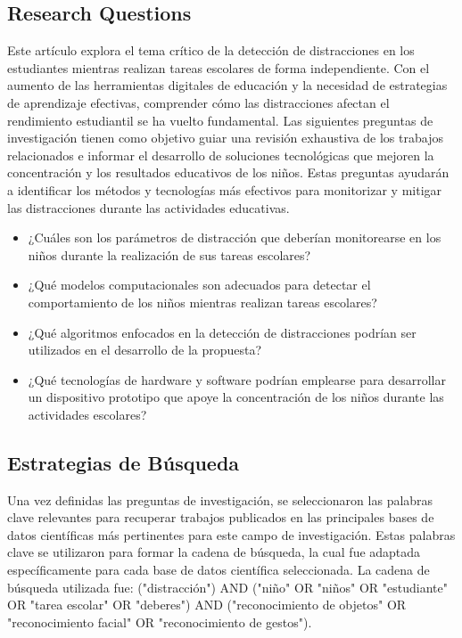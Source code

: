 \documentclass[a4paper,fleqn]{cas-sc}
\begin{document}
	\subsection{Research Questions}
	Este artículo explora el tema crítico de la detección de distracciones en los estudiantes mientras realizan tareas escolares de forma independiente. Con el aumento de las herramientas digitales de educación y la necesidad de estrategias de aprendizaje efectivas, comprender cómo las distracciones afectan el rendimiento estudiantil se ha vuelto fundamental. Las siguientes preguntas de investigación tienen como objetivo guiar una revisión exhaustiva de los trabajos relacionados e informar el desarrollo de soluciones tecnológicas que mejoren la concentración y los resultados educativos de los niños. Estas preguntas ayudarán a identificar los métodos y tecnologías más efectivos para monitorizar y mitigar las distracciones durante las actividades educativas.
	
	\begin{itemize}
		\item ¿Cuáles son los parámetros de distracción que deberían monitorearse en los niños durante la realización de sus tareas escolares?
		\item ¿Qué modelos computacionales son adecuados para detectar el comportamiento de los niños mientras realizan tareas escolares?
		\item ¿Qué algoritmos enfocados en la detección de distracciones podrían ser utilizados en el desarrollo de la propuesta?
		\item ¿Qué tecnologías de hardware y software podrían emplearse para desarrollar un dispositivo prototipo que apoye la concentración de los niños durante las actividades escolares?
	\end{itemize}
	
	\subsection{Estrategias de Búsqueda}
	Una vez definidas las preguntas de investigación, se seleccionaron las palabras clave relevantes para recuperar trabajos publicados en las principales bases de datos científicas más pertinentes para este campo de investigación. Estas palabras clave se utilizaron para formar la cadena de búsqueda, la cual fue adaptada específicamente para cada base de datos científica seleccionada. La cadena de búsqueda utilizada fue: ("distracción") AND ("niño" OR "niños" OR "estudiante" OR "tarea escolar" OR "deberes") AND ("reconocimiento de objetos" OR "reconocimiento facial" OR "reconocimiento de gestos").
	
\end{document}
